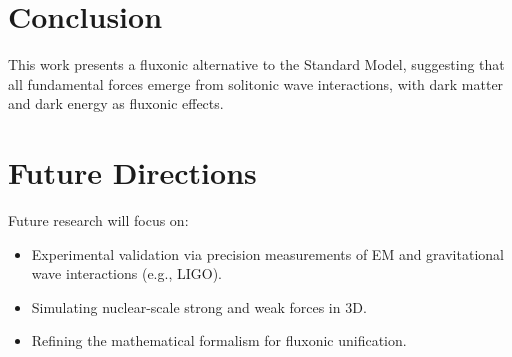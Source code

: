\documentclass{article}
\begin{document}
\section{Conclusion}
This work presents a fluxonic alternative to the Standard Model, suggesting that all fundamental forces emerge from solitonic wave interactions, with dark matter and dark energy as fluxonic effects.

\section{Future Directions}
Future research will focus on:
\begin{itemize}
    \item Experimental validation via precision measurements of EM and gravitational wave interactions (e.g., LIGO).
    \item Simulating nuclear-scale strong and weak forces in 3D.
    \item Refining the mathematical formalism for fluxonic unification.
\end{itemize}
\end{document}
